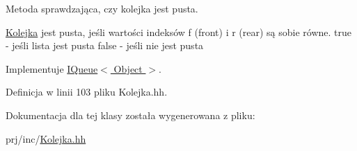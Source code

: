 Metoda sprawdzająca, czy kolejka jest pusta. 

\hyperlink{class_kolejka}{Kolejka} jest pusta, jeśli wartości indeksów f (front) i r (rear) są sobie równe.  true -\/ jeśli lista jest pusta  false -\/ jeśli nie jest pusta 

Implementuje \hyperlink{class_i_queue_ae1c9e42be6ff647666c4468d3eec55a1}{I\-Queue$<$ Object $>$}.



Definicja w linii 103 pliku Kolejka.\-hh.



Dokumentacja dla tej klasy została wygenerowana z pliku\-:\begin{DoxyCompactItemize}
\item 
prj/inc/\hyperlink{_kolejka_8hh}{Kolejka.\-hh}\end{DoxyCompactItemize}
